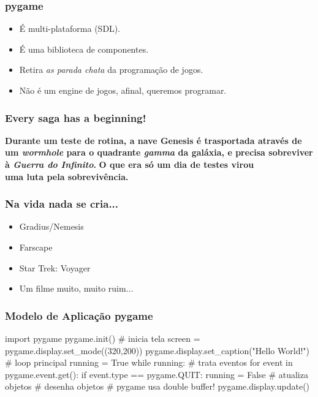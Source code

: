 
\begin{frame}
    \frametitle{pygame}

    \begin{itemize}
        \item É multi-plataforma (SDL).
        \item É uma biblioteca de componentes.
        \item Retira \textit{as parada chata} da programação de jogos.
        \item Não é um engine de jogos, afinal, queremos programar.
    \end{itemize}
\end{frame}


\begin{frame}
    \frametitle{Every saga has a beginning!}
    \vfill
    \begin{center}
    \large \textbf{Durante um teste de rotina, a nave Genesis é trasportada
    através de um \textit{wormhole} para o quadrante \textit{gamma} da galáxia,
    e precisa sobreviver à \textit{Guerra do Infinito}.}
    \vfill
    \large\textbf{O que era só um dia de testes virou\\uma luta pela sobrevivência.}
    \end{center}
    \vfill
\end{frame}

\begin{frame}
    \frametitle{Na vida nada se cria...}

    \begin{itemize}
        \item Gradius/Nemesis
        \item Farscape
        \item Star Trek: Voyager
        \item Um filme muito, muito ruim...
    \end{itemize}
\end{frame}


\begin{frame}[fragile]
    \frametitle{Modelo de Aplicação pygame}

    \begin{python}
        import pygame
        pygame.init()
        # inicia tela
        screen = pygame.display.set_mode((320,200))
        pygame.display.set_caption("Hello World!")
        # loop principal
        running = True
        while running:
            # trata eventos
            for event in pygame.event.get():
                if event.type == pygame.QUIT:
                    running = False
            # atualiza objetos
            # desenha objetos
            # pygame usa double buffer!
            pygame.display.update()
    \end{python}
\end{frame}

